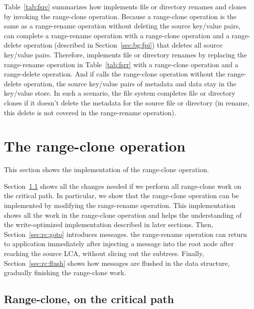 Table~\ref{tab:fsrc} summarizes how \betrfs implements file or
directory renames and clones by invoking the range-clone operation.
Because a range-clone operation is the same as a range-rename operation without
deleting the source key/value pairs,
\betrfs can complete a range-rename operation with a range-clone operation and
a range-delete operation (described in Section~\ref{sec:bg:fpi})
that deletes all source key/value pairs.
Therefore, \betrfs implements file or directory renames
by replacing the range-rename operation in Table~\ref{tab:fsrr} with
a range-clone operation and a range-delete operation.
And if \betrfs calls the range-clone operation without the range-delete
operation,
the source key/value pairs of metadata and data stay in the key/value store.
In such a scenario, the file system completes file or directory clones if it
doesn't delete the metadata for the source file or directory
(in rename, this delete is not covered in the range-rename operation).

\section{The range-clone operation}
\label{sec:rc:rc}

This section shows the implementation of the range-clone operation.

Section~\ref{sec:rc:crit} shows all the changes needed if we perform all
range-clone work on the critical path.
In particular, we show that the range-clone operation can be implemented
by modifying the range-rename operation.
This implementation shows all the work in the range-clone operation and
helps the understanding of the write-optimized implementation described in
later sections.
Then, Section~\ref{sec:rc:goto} introduces \goto messages.
the range-rename operation can return to application immediately after injecting
a \goto message into the root node after reaching the source LCA,
without slicing out the subtrees.
Finally, Section~\ref{sec:rc:flush} shows how \goto messages are flushed in
the data structure, gradually finishing the range-clone work.

\subsection{Range-clone, on the critical path}
\label{sec:rc:crit}

